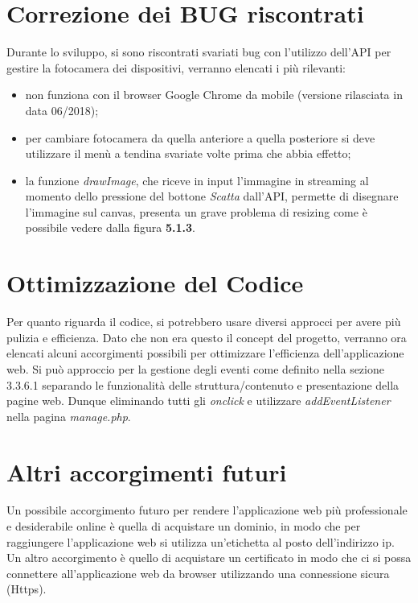 \section{Correzione dei BUG riscontrati}
Durante lo sviluppo, si sono riscontrati svariati bug con l'utilizzo dell'API per gestire la fotocamera dei dispositivi, verranno elencati i più rilevanti:
\begin{itemize}
\item non funziona con il browser Google Chrome da mobile (versione rilasciata in data 06/2018);
\item per cambiare fotocamera da quella anteriore a quella posteriore si deve utilizzare il menù a tendina svariate volte prima che abbia effetto;
\item la funzione \textit{drawImage}, che riceve in input l'immagine in streaming al momento dello pressione del bottone \textit{Scatta} dall'API, permette di disegnare l'immagine sul canvas, presenta un grave problema di resizing come è possibile vedere dalla figura \textbf{5.1.3}.
\end{itemize}
\section{Ottimizzazione del Codice}
Per quanto riguarda il codice, si potrebbero usare diversi approcci per avere più pulizia e efficienza. Dato che non era questo il concept del progetto, verranno ora elencati alcuni accorgimenti possibili per ottimizzare l'efficienza dell'applicazione web.
Si può approccio per la gestione degli eventi come definito nella sezione 3.3.6.1 separando le funzionalità delle struttura/contenuto e presentazione della pagine web. \newline
Dunque eliminando tutti gli \textit{onclick} e utilizzare \textit{addEventListener} nella pagina \textit{manage.php}.
\section{Altri accorgimenti futuri}
Un possibile accorgimento futuro per rendere l'applicazione web più professionale e desiderabile online è quella di acquistare un dominio, in modo che per raggiungere l'applicazione web si utilizza un'etichetta al posto dell'indirizzo ip. \newline
Un altro accorgimento è quello di acquistare un certificato in modo che ci si possa connettere all'applicazione web da browser utilizzando una connessione sicura (Https).

